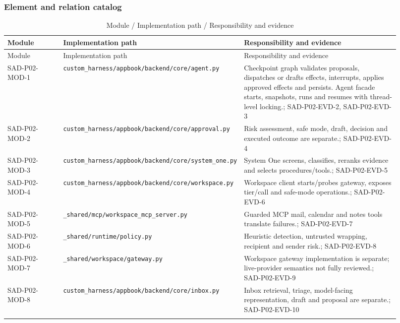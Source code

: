 \documentclass[10pt,letterpaper]{article}
\begin{document}
\subsubsection{Element and relation catalog}
\begin{longtable}{@{}>{\raggedright\arraybackslash}p{0.15\linewidth}>{\raggedright\arraybackslash}p{0.34\linewidth}>{\raggedright\arraybackslash}p{0.43\linewidth}@{}}
\caption{Module / Implementation path / Responsibility and evidence}\\
\toprule Module & Implementation path & Responsibility and evidence\\\midrule\endfirsthead
\toprule Module & Implementation path & Responsibility and evidence\\\midrule\endhead
SAD-P02-MOD-1 & \nolinkurl{custom_harness/appbook/backend/core/agent.py} & Checkpoint graph validates proposals, dispatches or drafts effects, interrupts, applies approved effects and persists. Agent facade starts, snapshots, runs and resumes with thread-level locking.; SAD-P02-EVD-2, SAD-P02-EVD-3\\\addlinespace
SAD-P02-MOD-2 & \nolinkurl{custom_harness/appbook/backend/core/approval.py} & Risk assessment, safe mode, draft, decision and executed outcome are separate.; SAD-P02-EVD-4\\\addlinespace
SAD-P02-MOD-3 & \nolinkurl{custom_harness/appbook/backend/core/system_one.py} & System One screens, classifies, reranks evidence and selects procedures/tools.; SAD-P02-EVD-5\\\addlinespace
SAD-P02-MOD-4 & \nolinkurl{custom_harness/appbook/backend/core/workspace.py} & Workspace client starts/probes gateway, exposes tier/call and safe-mode operations.; SAD-P02-EVD-6\\\addlinespace
SAD-P02-MOD-5 & \nolinkurl{_shared/mcp/workspace_mcp_server.py} & Guarded MCP mail, calendar and notes tools translate failures.; SAD-P02-EVD-7\\\addlinespace
SAD-P02-MOD-6 & \nolinkurl{_shared/runtime/policy.py} & Heuristic detection, untrusted wrapping, recipient and sender risk.; SAD-P02-EVD-8\\\addlinespace
SAD-P02-MOD-7 & \nolinkurl{_shared/workspace/gateway.py} & Workspace gateway implementation is separate; live-provider semantics not fully reviewed.; SAD-P02-EVD-9\\\addlinespace
SAD-P02-MOD-8 & \nolinkurl{custom_harness/appbook/backend/core/inbox.py} & Inbox retrieval, triage, model-facing representation, draft and proposal are separate.; SAD-P02-EVD-10\\\addlinespace

\end{longtable}
\end{document}
